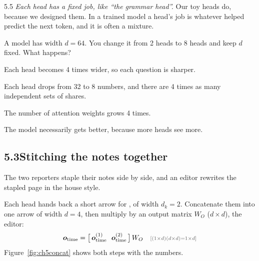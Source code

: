 \begin{wrongidea}{5.5}
\emph{Each head has a fixed job, like ``the grammar head''.} Our toy heads do, because we designed them. In a
trained model a head's job is whatever helped predict the next token, and it is often a mixture.
\end{wrongidea}

\begin{checkq}
A model has width $d=64$. You change it from 2 heads to 8 heads and keep $d$ fixed. What happens?
\begin{options}
\item Each head becomes 4 times wider, so each question is sharper.
\item Each head drops from 32 to 8 numbers, and there are 4 times as many independent sets of shares.
\item The number of attention weights grows 4 times.
\item The model necessarily gets better, because more heads see more.
\end{options}
\end{checkq}


\subsection*{5.3\quad Stitching the notes together}

\Picture The two reporters staple their notes side by side, and an editor rewrites the stapled page in the
house style.

\Exactly Each head hands back a short arrow for , of width $d_k=2$. Concatenate them into one
arrow of width $d=4$, then multiply by an output matrix $W_O$ ($d\times d$), the editor:
\[
\bm{o}_{\text{time}} = \big[\,\bm{o}^{(1)}_{\text{time}}\ \ \bm{o}^{(2)}_{\text{time}}\,\big]\,W_O \shape{(1\times d)(d\times d)=1\times d}
\]
Figure~\ref{fig:ch5concat} shows both steps with the numbers.

\begin{center}
\fitwidthFourFive{}
\label{fig:ch5concat}
\end{center}


